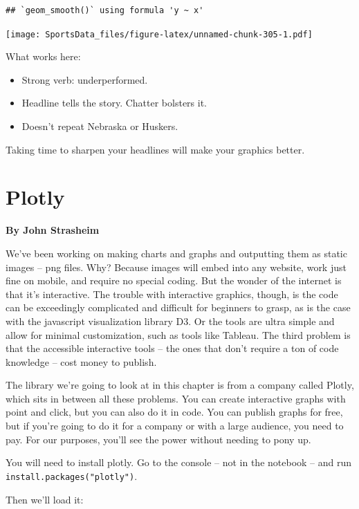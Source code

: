\documentclass[
]{book}
\providecommand{\tightlist}{%
  \setlength{\itemsep}{0pt}\setlength{\parskip}{0pt}}
\begin{document}
\begin{verbatim}
## `geom_smooth()` using formula 'y ~ x'
\end{verbatim}

\texttt{[image: SportsData\_files/figure-latex/unnamed-chunk-305-1.pdf]}

What works here:

\begin{itemize}
\tightlist
\item
  Strong verb: underperformed.
\item
  Headline tells the story. Chatter bolsters it.
\item
  Doesn't repeat Nebraska or Huskers.
\end{itemize}

Taking time to sharpen your headlines will make your graphics better.

\hypertarget{plotly}{%
\chapter{Plotly}\label{plotly}}

\textbf{By John Strasheim}

We've been working on making charts and graphs and outputting them as static images -- png files. Why? Because images will embed into any website, work just fine on mobile, and require no special coding. But the wonder of the internet is that it's interactive. The trouble with interactive graphics, though, is the code can be exceedingly complicated and difficult for beginners to grasp, as is the case with the javascript visualization library D3. Or the tools are ultra simple and allow for minimal customization, such as tools like Tableau. The third problem is that the accessible interactive tools -- the ones that don't require a ton of code knowledge -- cost money to publish.

The library we're going to look at in this chapter is from a company called Plotly, which sits in between all these problems. You can create interactive graphs with point and click, but you can also do it in code. You can publish graphs for free, but if you're going to do it for a company or with a large audience, you need to pay. For our purposes, you'll see the power without needing to pony up.

You will need to install plotly. Go to the console -- not in the notebook -- and run \texttt{install.packages("plotly")}.

Then we'll load it:
\end{document}
